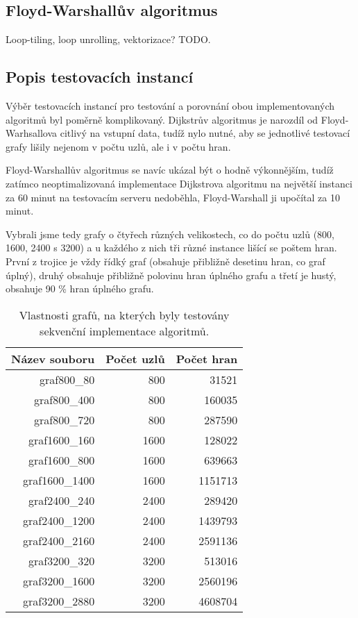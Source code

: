 \documentclass[a4paper,11pt]{article}
\begin{document}
\subsection{Floyd-Warshallův algoritmus}
Loop-tiling, loop unrolling, vektorizace? TODO.

\subsection{Popis testovacích instancí}
Výběr testovacích instancí pro testování a porovnání obou implementovaných algoritmů byl poměrně komplikovaný. Dijkstrův algoritmus je narozdíl od Floyd-Warhsallova citlivý na vstupní data, tudíž nylo nutné, aby se jednotlivé testovací grafy lišily nejenom v počtu uzlů, ale i v počtu hran. 
\par
Floyd-Warshallův algoritmus se navíc ukázal být o hodně výkonnějším, tudíž zatímco neoptimalizovaná implementace Dijkstrova algoritmu na nej\-větší instanci za 60 minut na testovacím serveru nedoběhla, Floyd-Warshall ji upočítal za 10 minut.
\par
Vybrali jsme tedy grafy o čtyřech různých velikostech, co do počtu uzlů (800, 1600, 2400 s 3200) a u každého z nich tři různé instance lišící se poštem hran. První z trojice je vždy řídký graf (obsahuje přibližně desetinu hran, co graf úplný), druhý obsahuje přibližně polovinu hran úplného grafu a třetí je hustý, obsahuje 90 \% hran úplného grafu.
\begin{table}[H]
  \begin{center}
      \begin{tabular}{|r|r|r|}
      \hline
      Název souboru 	& Počet uzlů  	& Počet hran  		\\ \hline
      graf800\_80  	& 800    	& 31521             	\\ \hline
      graf800\_400     	& 800    	& 160035        	\\ \hline
      graf800\_720  	& 800    	& 287590             	\\ \hline
      graf1600\_160    	& 1600    	& 128022          	\\ \hline
      graf1600\_800  	& 1600    	& 639663             	\\ \hline
      graf1600\_1400   	& 1600    	& 1151713          	\\ \hline
      graf2400\_240  	& 2400    	& 289420             	\\ \hline
      graf2400\_1200   	& 2400    	& 1439793          	\\ \hline
      graf2400\_2160  	& 2400    	& 2591136             	\\ \hline
      graf3200\_320    	& 3200    	& 513016          	\\ \hline
      graf3200\_1600  	& 3200    	& 2560196             	\\ \hline
      graf3200\_2880   	& 3200    	& 4608704          	\\ \hline
      \end{tabular}
  \caption{Vlastnosti grafů, na kterých byly testovány sekvenční implementace algoritmů.}
  \label{tab:instance}
  \end{center}
\end{table}
\end{document}

